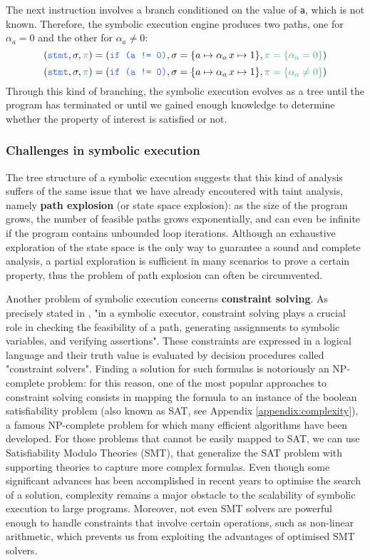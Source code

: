 \documentclass[12pt,a4paper]{book}
\theoremstyle{definition}
\begin{document}
	The next instruction involves a branch conditioned on the value of \texttt{a}, which is not known. Therefore, the symbolic execution engine produces two paths, one for $\alpha_a = 0$ and the other for $\alpha_a \neq 0$:
	\[
	(\textcolor{blue}{\texttt{stmt}}, \sigma, \textcolor{green}{\pi}) = (\textcolor{blue}{\texttt{if (a != 0)}}, \sigma = \{a \mapsto \alpha_a\, x \mapsto 1\}, \textcolor{green}{\pi = \{\alpha_a = 0\}})
	\]
	\[
	(\textcolor{blue}{\texttt{stmt}}, \sigma, \textcolor{green}{\pi}) = (\textcolor{blue}{\texttt{if (a != 0)}}, \sigma = \{a \mapsto \alpha_a\, x \mapsto 1\}, \textcolor{green}{\pi = \{\alpha_a \neq 0\}})
	\]
	Through this kind of branching, the symbolic execution evolves as a tree until the program has terminated or until we gained enough knowledge to determine whether the property of interest is satisfied or not.
	\subsubsection{Challenges in symbolic execution}
	The tree structure of a symbolic execution suggests that this kind of analysis suffers of the same issue that we have already encoutered with taint analysis, namely \textbf{path explosion} (or state space explosion): as the size of the program grows, the number of feasible paths grows exponentially, and can even be infinite if the program contains unbounded loop iterations. Although an exhaustive exploration of the state space is the only way to guarantee a sound and complete analysis, a partial exploration is sufficient in many scenarios to prove a certain property, thus the problem of path explosion can often be circumvented.
	
	Another problem of symbolic execution concerns \textbf{constraint solving}. As precisely stated in \cite{Baldoni2018}, "in a symbolic executor, constraint solving plays a crucial role in checking the feasibility of a path, generating assignments to symbolic variables, and verifying assertions". These constraints are expressed in a logical language and their truth value is evaluated by decision procedures called "constraint solvers". 
	Finding a solution for such formulas is notoriously an NP-complete problem: for this reason, one of the most popular approaches to constraint solving consists in mapping the formula to an instance of the boolean satisfiability problem (also known as SAT, see Appendix \ref{appendix:complexity}), a famous NP-complete problem for which many efficient algorithms have been developed. For those problems that cannot be easily mapped to SAT, we can use Satisfiability Modulo Theories (SMT), that generalize the SAT problem with supporting theories to capture more complex formulas. Even though some significant advances has been accomplished in recent years to optimise the search of a solution, complexity remains a major obstacle to the scalability of symbolic execution to large programs. Moreover, not even SMT solvers are powerful enough to handle constraints that involve certain operations, such as non-linear arithmetic, which prevents us from exploiting the advantages of optimised SMT solvers.
	
\end{document}
